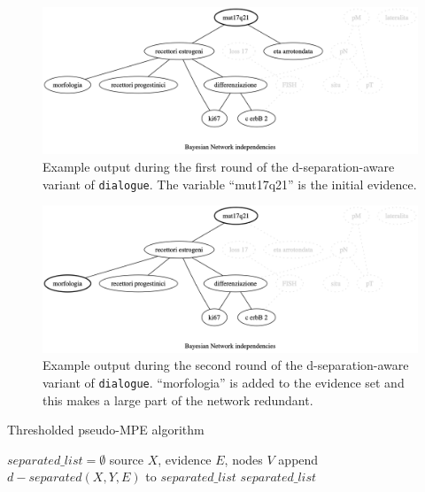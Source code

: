 \begin{figure}[htbp]
\centerline{\includegraphics[width=\columnwidth]{methodology/images/example-d-separation-mpe_1}}
\caption{Example output during the first round of the d-separation-aware variant of \texttt{dialogue}.
	The variable \enquote{mut17q21} is the initial evidence.}
\label{fig:pseudo-mpe-independencies_1}
\end{figure}

\begin{figure}[htbp]
\centerline{\includegraphics[width=\columnwidth]{methodology/images/example-d-separation-mpe_2}}
\caption{Example output during the second round of the d-separation-aware variant of \texttt{dialogue}.
	\enquote{morfologia} is added to the evidence set and this makes a large part of the network redundant.}
\label{fig:pseudo-mpe-independencies_2}
\end{figure}

\begin{algorithm}[htp!]
	\caption{Thresholded pseudo-MPE algorithm}
	\label{alg:pseudo-mpe-thresholded}
	\begin{algorithmic}
		\STATE $separated\_list = \emptyset$
		 source $X$, evidence $E$, nodes $V$
		\STATE append $d-separated(X, Y, E)$ to $separated\_list$ 
		\ENDFOR
		 $separated\_list$
	\end{algorithmic}
\end{algorithm} 


